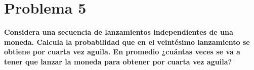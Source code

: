 \section*{Problema 5}
\textbf{Considera una secuencia de lanzamientos independientes de una moneda. Calcula la probabilidad que en el veintésimo lanzamiento se obtiene por cuarta vez aguila. En promedio ¿cuántas veces se va a tener que lanzar la moneda para obtener por cuarta vez aguila?}